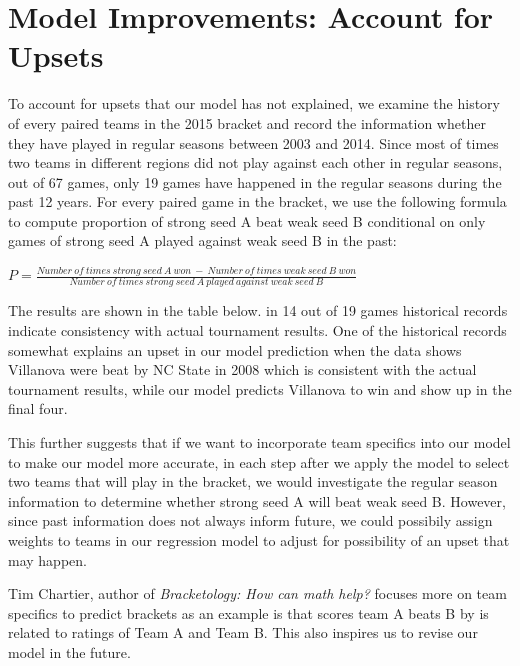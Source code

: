 \documentclass{article} %
\begin{document}
\section{Model Improvements: Account for Upsets}

To account for upsets that our model has not explained, we examine the history of every paired teams in the 2015 bracket and record the information whether they have played in regular seasons between 2003 and 2014. Since most of times two teams in different regions did not play against each other in regular seasons, out of 67 games, only 19 games have happened in the regular seasons during the past 12 years. For every paired game in the bracket, we use the following formula to compute proportion of strong seed A beat weak seed B conditional on only games of strong seed A played against weak seed B in the past:

$P=\frac{Number \ of \ times \ strong \ seed \ A \ won \ - \ Number \ of \ times \ weak \ seed \ B \ won}{Number \ of \ times \ strong \ seed \ A \ played \ against \ weak \ seed \ B }$


The results are shown in the table below. in 14 out of 19 games historical records indicate consistency with actual tournament results. One of the historical records somewhat explains an upset in our model prediction when the data shows Villanova were beat by NC State in 2008 which is consistent with the actual tournament results, while our model predicts Villanova to win and show up in the final four. 

This further suggests that if we want to incorporate team specifics into our model to make our model more accurate, in each step after we apply the model to select two teams that will play in the bracket, we would investigate the regular season information to determine whether strong seed A will beat weak seed B. However, since past information does not always inform future, we could possibily assign weights to teams in our regression model to adjust for possibility of an upset that may happen. 

Tim Chartier, author of \textit{Bracketology: How can math help?} focuses more on team specifics to predict brackets as an example is that scores team A beats B by is related to ratings of Team A and Team B. This also inspires us to revise our model in the future. 
\end{document}
